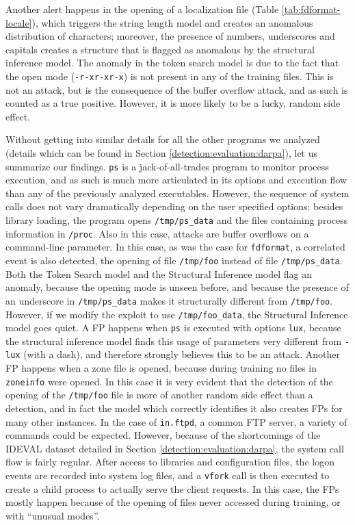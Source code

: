 Another alert happens in the opening of a localization file (Table
\ref{tab:fdformat-locale}), which triggers the string length model and
creates an anomalous distribution of characters; moreover, the
presence of numbers, underscores and capitals creates a structure that
is flagged as anomalous by the structural inference model. The anomaly
in the token search model is due to the fact that the open mode
(\texttt{-r-xr-xr-x}) is not present in any of the training
files. This is not an attack, but is the consequence of the buffer
overflow attack, and as such is counted as a true positive. However,
it is more likely to be a lucky, random side effect.

Without getting into similar details for all the other programs we
analyzed (details which can be found in Section
\ref{detection:evaluation:darpa}), let us summarize our
findings. \texttt{ps} is a jack-of-all-trades program to monitor
process execution, and as such is much more articulated in its options
and execution flow than any of the previously analyzed
executables. However, the sequence of system calls does not vary
dramatically depending on the user specified options: besides library
loading, the program opens \texttt{/tmp/ps\_data} and the files
containing process information in \texttt{/proc}. Also in this case,
attacks are buffer overflows on a command-line parameter. In this
case, as was the case for \texttt{fdformat}, a correlated event is
also detected, the opening of file \texttt{/tmp/foo} instead of file
\texttt{/tmp/ps\_data}. Both the Token Search model and the Structural
Inference model flag an anomaly, because the opening mode is unseen
before, and because the presence of an underscore in
\texttt{/tmp/ps\_data} makes it structurally different from
\texttt{/tmp/foo}. However, if we modify the exploit to use
\texttt{/tmp/foo\_data}, the Structural Inference model goes quiet. A
\ac{FP} happens when \texttt{ps} is executed with options
\texttt{lux}, because the structural inference model finds this usage
of parameters very different from \texttt{-lux} (with a dash), and
therefore strongly believes this to be an attack. Another \ac{FP}
happens when a zone file is opened, because during training no files
in \texttt{zoneinfo} were opened. In this case it is very evident that
the detection of the opening of the \texttt{/tmp/foo} file is more of
another random side effect than a detection, and in fact the model
which correctly identifies it also creates \acp{FP} for many
other instances. In the case of \texttt{in.ftpd}, a common
\ac{FTP} server, a variety of commands could be
expected. However, because of the shortcomings of the
\ac{IDEVAL} dataset detailed in Section
\ref{detection:evaluation:darpa}, the system call flow is fairly
regular. After access to libraries and configuration files, the logon
events are recorded into system log files, and a \texttt{vfork} call
is then executed to create a child process to actually serve the
client requests. In this case, the \acp{FP} mostly happen
because of the opening of files never accessed during training, or
with ``unusual modes''.

